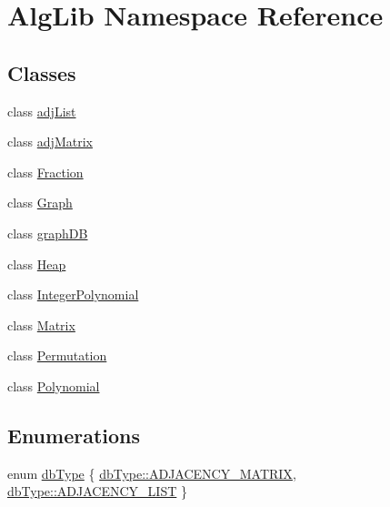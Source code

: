 \hypertarget{namespace_alg_lib}{}\section{Alg\+Lib Namespace Reference}
\label{namespace_alg_lib}
\subsection*{Classes}
\begin{DoxyCompactItemize}
\item 
class \hyperlink{class_alg_lib_1_1adj_list}{adj\+List}
\item 
class \hyperlink{class_alg_lib_1_1adj_matrix}{adj\+Matrix}
\item 
class \hyperlink{class_alg_lib_1_1_fraction}{Fraction}
\item 
class \hyperlink{class_alg_lib_1_1_graph}{Graph}
\item 
class \hyperlink{class_alg_lib_1_1graph_d_b}{graph\+DB}
\item 
class \hyperlink{class_alg_lib_1_1_heap}{Heap}
\item 
class \hyperlink{class_alg_lib_1_1_integer_polynomial}{Integer\+Polynomial}
\item 
class \hyperlink{class_alg_lib_1_1_matrix}{Matrix}
\item 
class \hyperlink{class_alg_lib_1_1_permutation}{Permutation}
\item 
class \hyperlink{class_alg_lib_1_1_polynomial}{Polynomial}
\end{DoxyCompactItemize}
\subsection*{Enumerations}
\begin{DoxyCompactItemize}
\item 
enum \hyperlink{namespace_alg_lib_a11966d2ea6c430adfb83a6ebaa05e337}{db\+Type} \{ \hyperlink{namespace_alg_lib_a11966d2ea6c430adfb83a6ebaa05e337a9d8e68c3898f769422174fed0be93fd2}{db\+Type\+::\+A\+D\+J\+A\+C\+E\+N\+C\+Y\+\_\+\+M\+A\+T\+R\+IX}, 
\hyperlink{namespace_alg_lib_a11966d2ea6c430adfb83a6ebaa05e337a6d02e698876f8aa2b2e975e8c0010c10}{db\+Type\+::\+A\+D\+J\+A\+C\+E\+N\+C\+Y\+\_\+\+L\+I\+ST}
 \}
\end{DoxyCompactItemize}
